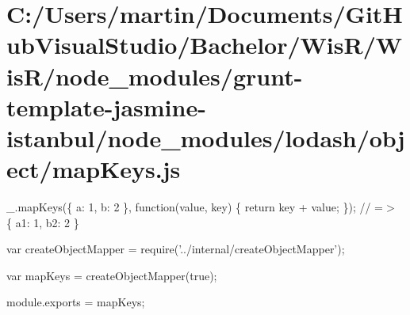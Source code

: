 \hypertarget{_c_1_2_users_2martin_2_documents_2_git_hub_visual_studio_2_bachelor_2_wis_r_2_wis_r_2node_moduleb1673319e671d80597bf4ac4fd78a47b}{}\section{C\+:/\+Users/martin/\+Documents/\+Git\+Hub\+Visual\+Studio/\+Bachelor/\+Wis\+R/\+Wis\+R/node\+\_\+modules/grunt-\/template-\/jasmine-\/istanbul/node\+\_\+modules/lodash/object/map\+Keys.\+js}
\+\_\+.\+map\+Keys(\{ \textquotesingle{}a\textquotesingle{}\+: 1, \textquotesingle{}b\textquotesingle{}\+: 2 \}, function(value, key) \{ return key + value; \}); // =$>$ \{ \textquotesingle{}a1\textquotesingle{}\+: 1, \textquotesingle{}b2\textquotesingle{}\+: 2 \}


\begin{DoxyCodeInclude}
var createObjectMapper = require(\textcolor{stringliteral}{'../internal/createObjectMapper'});

var mapKeys = createObjectMapper(\textcolor{keyword}{true});

module.exports = mapKeys;
\end{DoxyCodeInclude}
 